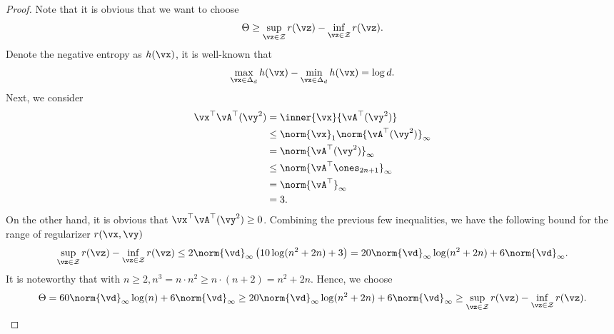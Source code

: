 \begin{proof}
    Note that it is obvious that we want to choose
    \begin{equation*}
        \Theta \geq \sup_{\vz \in \mathcal{Z}} r(\vz) - \inf_{\vz \in \mathcal{Z}} r(\vz).
    \end{equation*}
    Denote the negative entropy as $h(\vx)$, it is well-known that
    \begin{align*}
        \max_{\vx \in \Delta_{d}} h(\vx) - \min_{\vx \in \Delta_{d}} h(\vx) = \log d.
    \end{align*}
    Next, we consider
    \begin{align*}
        \vx^\top \vA^\top (\vy^2) &= \inner{\vx}{\vA^\top (\vy^2)} \\
        &\leq \norm{\vx}_1 \norm{\vA^\top(\vy^2)}_\infty \\
        &= \norm{\vA^\top(\vy^2)}_\infty\\
        &\leq \norm{\vA^\top \ones_{2n+1}}_\infty \\
        &= \norm{\vA^\top}_\infty \\
        &= 3.
    \end{align*}
    On the other hand, it is obvious that $\vx^\top \vA^\top (\vy^2) \geq 0$. Combining the previous few inequalities, we have the following bound for the range of regularizer $r(\vx, \vy)$
    \begin{equation*}
        \sup_{\vz \in \mathcal{Z}} r(\vz) - \inf_{\vz \in \mathcal{Z}} r(\vz) \leq 2 \norm{\vd}_\infty \left( 10\log (n^2+2n) + 3 \right) = 20 \norm{\vd}_\infty \log (n^2+2n) + 6 \norm{\vd}_\infty.
    \end{equation*}
    It is noteworthy that with $n \geq 2, n^{3} = n \cdot n^2 \geq n \cdot (n+2) = n^2 + 2n$. Hence, we choose 
    \begin{equation*}
        \Theta = 60 \norm{\vd}_\infty \log (n) + 6 \norm{\vd}_\infty \geq 20 \norm{\vd}_\infty \log (n^2+2n) + 6 \norm{\vd}_\infty \geq \sup_{\vz \in \mathcal{Z}} r(\vz) - \inf_{\vz \in \mathcal{Z}} r(\vz).
    \end{equation*}
\end{proof}
